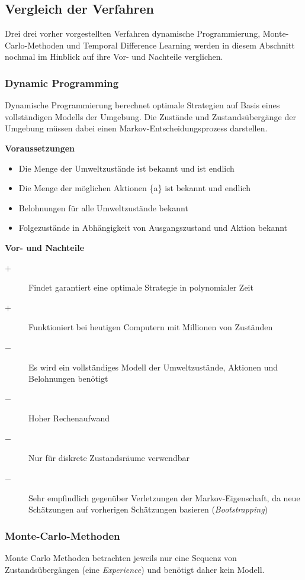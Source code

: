 \documentclass[10pt]{scrartcl}
\begin{document}
\subsection{Vergleich der Verfahren}
Drei drei vorher vorgestellten Verfahren dynamische Programmierung, Monte-Carlo-Methoden und Temporal Difference Learning werden in diesem Abschnitt nochmal im Hinblick auf ihre Vor- und Nachteile verglichen.

\subsubsection{Dynamic Programming}
Dynamische Programmierung berechnet optimale Strategien auf Basis eines vollständigen Modells der Umgebung. Die Zustände und Zustandsübergänge der Umgebung müssen dabei einen Markov-Entscheidungsprozess darstellen.

\textbf{Voraussetzungen}
\begin{itemize}
\item{Die Menge der Umweltzustände ist bekannt und ist endlich}
\item{Die Menge der möglichen Aktionen \{a\} ist bekannt und endlich}
\item{Belohnungen für alle Umweltzustände bekannt}
\item{Folgezustände in Abhängigkeit von Ausgangszustand und Aktion bekannt}
\end{itemize}

\vspace{1em}
\textbf{Vor- und Nachteile}
\begin{description}
\item[$+$] Findet garantiert eine optimale Strategie in polynomialer Zeit
\item[$+$] Funktioniert bei heutigen Computern mit Millionen von Zuständen
\item[$-$] Es wird ein vollständiges Modell der Umweltzustände, Aktionen und Belohnungen benötigt
\item[$-$] Hoher Rechenaufwand
\item[$-$] Nur für diskrete Zustandsräume verwendbar
\item[$-$] Sehr empfindlich gegenüber Verletzungen der Markov-Eigenschaft, da neue Schätzungen auf vorherigen Schätzungen basieren (\emph{Bootstrapping})
\end{description}

\subsubsection{Monte-Carlo-Methoden}
Monte Carlo Methoden betrachten jeweils nur eine Sequenz von Zustandsübergängen (eine \emph{Experience}) und benötigt daher kein Modell. \\
\end{document}
